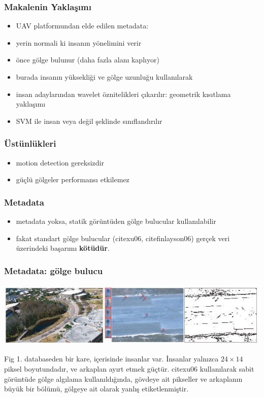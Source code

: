 \documentclass{beamer}
\begin{document}
\begin{frame}
	\frametitle {Makalenin Yaklaşımı}

	\begin{itemize}
		\item UAV platformundan elde edilen metadata:
		\item yerin normali ki insanın yönelimini verir
		\item önce gölge bulunur (daha fazla alanı kaplıyor)
		\item burada insanın yüksekliği ve gölge uzunluğu kullanılarak
		\item insan adaylarından wavelet öznitelikleri çıkarılır: geometrik
			  kısıtlama yaklaşımı
		\item SVM ile insan veya değil şeklinde sınıflandırılır
	\end{itemize}
\end{frame}

\begin{frame}
	\frametitle{Üstünlükleri}

	\begin{itemize}
		\item motion detection gereksizdir
		\item güçlü gölgeler performansı etkilemez
	\end{itemize}
\end{frame}

\begin{frame}
	\frametitle{Metadata}

	\begin{itemize}
		\item metadata yoksa, statik görüntüden gölge bulucular kullanılabilir
		\item fakat standart gölge bulucular (cite{xu06}, cite{finlayson06})
			gerçek veri üzerindeki başarımı
		\textbf{kötüdür}.
	\end{itemize}
\end{frame}

\begin{frame}
	\frametitle{Metadata: gölge bulucu}

	\includegraphics[width=1.0\textwidth]{img/fig1.jpg}

	Fig 1. databaseden bir kare, içerisinde insanlar var. İnsanlar yalnızca $24
	\times 14$ piksel boyutundadır, ve arkaplan ayırt etmek güçtür. cite{xu06}
	kullanılarak sabit görüntüde gölge algılama kullanıldığında, gövdeye ait
	pikseller ve arkaplanın büyük bir bölümü, gölgeye ait olarak yanlış
	etiketlenmiştir.
\end{frame}
\end{document}
